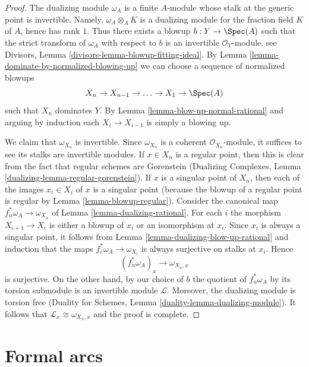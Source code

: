 \begin{proof}
The dualizing module $\omega_A$ is a finite $A$-module whose stalk at
the generic point is invertible. Namely, $\omega_A \otimes_A K$
is a dualizing module for the fraction field $K$ of $A$, hence has
rank $1$. Thus there exists a blowup $b : Y \to \Spec(A)$ such that
the strict transform of $\omega_A$ with respect to $b$ is an invertible
$\mathcal{O}_Y$-module, see
Divisors, Lemma \ref{divisors-lemma-blowup-fitting-ideal}.
By Lemma \ref{lemma-dominate-by-normalized-blowing-up}
we can choose a sequence of normalized blowups
$$
X_n \to X_{n - 1} \to \ldots \to X_1 \to \Spec(A)
$$
such that $X_n$ dominates $Y$. By Lemma \ref{lemma-blow-up-normal-rational}
and arguing by induction each $X_i \to X_{i - 1}$ is simply a blowing up.

\medskip\noindent
We claim that $\omega_{X_n}$ is invertible. Since $\omega_{X_n}$
is a coherent $\mathcal{O}_{X_n}$-module, it suffices to see its stalks
are invertible modules. If $x \in X_n$ is a regular point, then this is
clear from the fact that regular schemes are
Gorenstein (Dualizing Complexes, Lemma
\ref{dualizing-lemma-regular-gorenstein}). If $x$ is a singular point of
$X_n$, then each of the images $x_i \in X_i$ of $x$ is a singular point
(because the blowup of a regular point is regular by
Lemma \ref{lemma-blowup-regular}).
Consider the canonical map $f_n^*\omega_A \to \omega_{X_n}$ of
Lemma \ref{lemma-dualizing-rational}. For each $i$ the morphism
$X_{i + 1} \to X_i$ is either a blowup of $x_i$ or an isomorphism
at $x_i$. Since $x_i$ is always a singular point, it follows from
Lemma \ref{lemma-dualizing-blow-up-rational}
and induction that the maps $f_i^*\omega_A \to \omega_{X_i}$
is always surjective on stalks at $x_i$. Hence
$$
(f_n^*\omega_A)_x \longrightarrow \omega_{X_n, x}
$$
is surjective. On the other hand, by our choice of $b$ the quotient
of $f_n^*\omega_A$ by its torsion submodule is an invertible module
$\mathcal{L}$. Moreover, the dualizing module is torsion free
(Duality for Schemes, Lemma \ref{duality-lemma-dualizing-module}).
It follows that $\mathcal{L}_x \cong  \omega_{X_n, x}$ and the proof is
complete.
\end{proof}






\section{Formal arcs}
\label{section-arcs}

